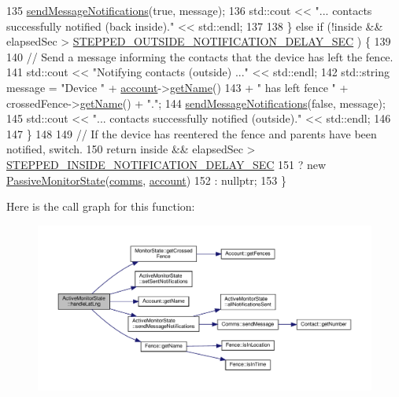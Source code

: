 \begin{DoxyCode}
135         \hyperlink{class_active_monitor_state_aae5b3a425c74e7017446be277d69c06d}{sendMessageNotifications}(\textcolor{keyword}{true}, message);
136         std::cout << \textcolor{stringliteral}{"... contacts successfully notified (back inside)."} << std::endl;
137 
138     \} \textcolor{keywordflow}{else} \textcolor{keywordflow}{if} (!inside && elapsedSec > \hyperlink{_active_monitor_state_8cpp_a61900fdfa0a56947870551db86143a1c}{STEPPED\_OUTSIDE\_NOTIFICATION\_DELAY\_SEC}
      ) \{
139 
140         \textcolor{comment}{// Send a message informing the contacts that the device has left the fence.}
141         std::cout << \textcolor{stringliteral}{"Notifying contacts (outside) ..."} << std::endl;
142         std::string message = \textcolor{stringliteral}{"Device "} + \hyperlink{class_monitor_state_a41128d4942ec0d5b107c63d1d95af811}{account}->\hyperlink{class_account_a1ef22885e8c6f145475c3306a4e6d74a}{getName}()
143                               + \textcolor{stringliteral}{" has left fence "} + crossedFence->\hyperlink{class_fence_a1d90d0ff61bec6cda8240f6365fc5d28}{getName}() + \textcolor{stringliteral}{"."};
144         \hyperlink{class_active_monitor_state_aae5b3a425c74e7017446be277d69c06d}{sendMessageNotifications}(\textcolor{keyword}{false}, message);
145         std::cout << \textcolor{stringliteral}{"... contacts successfully notified (outside)."} << std::endl;
146 
147     \}
148 
149     \textcolor{comment}{// If the device has reentered the fence and parents have been notified, switch.}
150     \textcolor{keywordflow}{return} inside && elapsedSec > \hyperlink{_active_monitor_state_8cpp_af734ccbfe87f3ed675b4836ae5761dbb}{STEPPED\_INSIDE\_NOTIFICATION\_DELAY\_SEC}
151            ? \textcolor{keyword}{new} \hyperlink{class_passive_monitor_state}{PassiveMonitorState}(\hyperlink{class_monitor_state_a41914e9963c67ef2d17774f04bad3518}{comms}, \hyperlink{class_monitor_state_a41128d4942ec0d5b107c63d1d95af811}{account})
152            : nullptr;
153 \}
\end{DoxyCode}
Here is the call graph for this function\+:\nopagebreak
\begin{figure}[H]
\begin{center}
\leavevmode
\includegraphics[width=350pt]{d9/db8/class_active_monitor_state_a0eb7622ad3aa4d372d90589838cb50a9_cgraph}
\end{center}
\end{figure}

